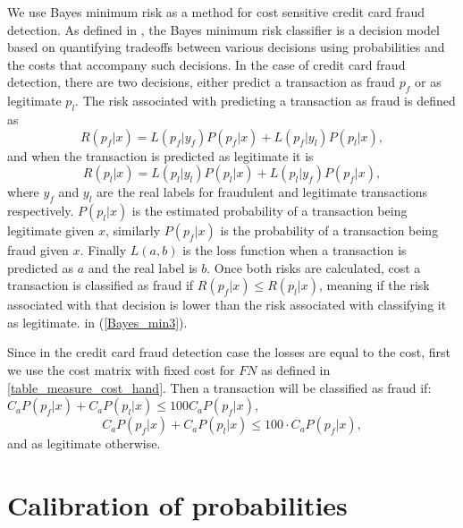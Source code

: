    We use Bayes minimum risk as a method for cost sensitive credit card fraud detection.
   As defined in \citep{Ghosh2006}, the Bayes minimum risk classifier is a decision model based on
   quantifying tradeoffs between various decisions using probabilities and the costs that accompany 
such decisions.
   In the case of credit card fraud detection, there are two decisions, either predict a 
transaction as fraud $p_f$ or as legitimate $p_l$.
   The risk associated with predicting a transaction as fraud is defined as
   \begin{equation}
    R(p_{f}|x)=L(p_{f}|y_{f})P(p_{f}|x)+L(p_{f}|y_{l})P(p_{l}|x),
    \label{Bayes_min1}
   \end{equation}
   and when the transaction is predicted as legitimate it is
   \begin{equation}
    R(p_{l}|x)=L(p_{l}|y_{l})P(p_{l}|x)+L(p_{l}|y_{f})P(p_{f}|x),
    \label{Bayes_min2}
   \end{equation}
   where %
   $y_f$ and $y_l$ are the real labels for fraudulent and legitimate transactions respectively. 
$P(p_l|x)$ is the 
   estimated probability of a transaction being legitimate given $x$, similarly 
   $P(p_f|x)$ is the probability of a transaction being fraud given $x$.
   Finally $L(a,b)$ is the loss function when a transaction is predicted as $a$ and the
   real label is $b$.
   Once both risks are calculated, %
cost
   a transaction is classified as fraud if $R(p_{f}|x)\le R(p_{l}|x)$, meaning if the risk 
associated with
   that decision is lower than the risk associated with classifying it as legitimate. %
in (\ref{Bayes_min3}).
   
   Since in the credit card fraud detection case the losses are equal to the cost, first we use 
   the cost matrix with fixed cost for $FN$ as defined in \tablename{ 
\ref{table_measure_cost_hand}}.
   Then a transaction will be classified as fraud if: $C_aP(p_{f}|x)+C_aP(p_{l}|x) \le 
100C_aP(p_{f}|x)$, 
   \begin{equation}
    C_aP(p_{f}|x)+C_aP(p_{l}|x) \le 100\cdot C_aP(p_{f}|x),
    \label{Bayes_min4}
   \end{equation}
   and as legitimate otherwise.
  
\section{Calibration of probabilities}

